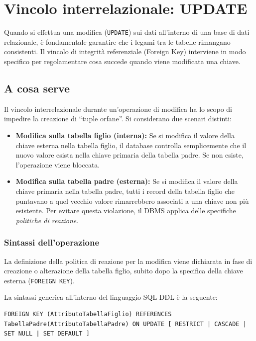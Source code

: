 \section{Vincolo interrelazionale: UPDATE}

Quando si effettua una modifica (\texttt{UPDATE}) sui dati all'interno di una base di dati relazionale, è fondamentale garantire che i legami tra le tabelle rimangano consistenti. Il vincolo di integrità referenziale (Foreign Key) interviene in modo specifico per regolamentare cosa succede quando viene modificata una chiave.

\subsection{A cosa serve}
Il vincolo interrelazionale durante un'operazione di modifica ha lo scopo di impedire la creazione di ``tuple orfane''. Si considerano due scenari distinti:
\begin{itemize}
    \item \textbf{Modifica sulla tabella figlio (interna):} Se si modifica il valore della chiave esterna nella tabella figlio, il database controlla semplicemente che il nuovo valore esista nella chiave primaria della tabella padre. Se non esiste, l'operazione viene bloccata.
    \item \textbf{Modifica sulla tabella padre (esterna):} Se si modifica il valore della chiave primaria nella tabella padre, tutti i record della tabella figlio che puntavano a quel vecchio valore rimarrebbero associati a una chiave non più esistente. Per evitare questa violazione, il DBMS applica delle specifiche \textit{politiche di reazione}.
\end{itemize}

\subsubsection{Sintassi dell'operazione}
La definizione della politica di reazione per la modifica viene dichiarata in fase di creazione o alterazione della tabella figlio, subito dopo la specifica della chiave esterna (\texttt{FOREIGN KEY}).

La sintassi generica all'interno del linguaggio SQL DDL è la seguente:
\begin{lstlisting}[language=sql_generic]
FOREIGN KEY (AttributoTabellaFiglio) REFERENCES TabellaPadre(AttributoTabellaPadre) ON UPDATE [ RESTRICT | CASCADE | SET NULL | SET DEFAULT ]
\end{lstlisting}


